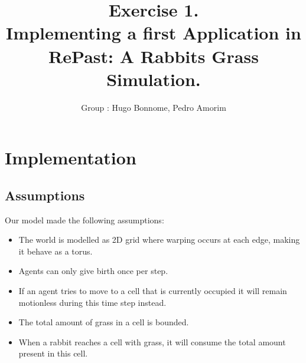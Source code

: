 \documentclass[11pt]{article}
\title{\bf Exercise 1.\\ Implementing a first Application in RePast: A Rabbits Grass Simulation.}
\author{Group \textnumero: Hugo Bonnome, Pedro Amorim}
\begin{document}
\maketitle

\section{Implementation}

\subsection{Assumptions}
Our model made the following assumptions:
\begin{itemize}
\item The world is modelled as 2D grid where warping occurs at each edge, making
  it behave as a torus.
\item Agents can only give birth once per step.
\item If an agent tries to move to a cell that is currently occupied it will
  remain motionless during this time step instead.
\item The total amount of grass in a cell is bounded.
\item When a rabbit reaches a cell with grass, it will consume the total amount present in this cell.
\end{itemize}
\end{document}
